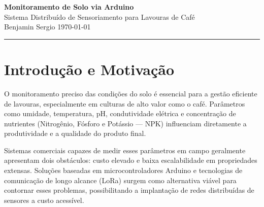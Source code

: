 \documentclass[12pt,a4paper]{article}
\begin{document}
\begin{center}
    {\LARGE\bfseries Monitoramento de Solo via Arduino}\\[0.4em]
    {\large Sistema Distribuído de Sensoriamento para Lavouras de Café}\\[0.8em]
    {\normalsize Benjamin Sergio \quad\textbar\quad \today}
\end{center}

\vspace{0.5em}
\hrule
\vspace{1em}

\begin{abstract}
\noindent
Este documento apresenta o projeto \textit{Monitoramento-Via-Arduino}, um sistema IoT
distribuído para monitoramento de parâmetros de solo em lavouras de café. O sistema
é composto por uma rede de nós sensores de baixo custo e baixo consumo energético
que coletam dados de umidade, temperatura, pH e nutrientes NPK, transmitindo-os
via LoRa a um nó mestre central. O nó mestre agrega os dados, aplica modelos de
inteligência artificial para predição indireta de NPK e os encaminha para plataformas
em nuvem. O protótipo inicial tem orçamento estimado em R\$~250,00.
\end{abstract}

\vspace{0.5em}

\section{Introdução e Motivação}

O monitoramento preciso das condições do solo é essencial para a gestão eficiente de
lavouras, especialmente em culturas de alto valor como o café. Parâmetros como
umidade, temperatura, pH, condutividade elétrica e concentração de nutrientes
(Nitrogênio, Fósforo e Potássio --- NPK) influenciam diretamente a produtividade e
a qualidade do produto final.

Sistemas comerciais capazes de medir esses parâmetros em campo geralmente apresentam
dois obstáculos: custo elevado e baixa escalabilidade em propriedades extensas.
Soluções baseadas em microcontroladores Arduino e tecnologias de comunicação de longo
alcance (LoRa) surgem como alternativa viável para contornar esses problemas,
possibilitando a implantação de redes distribuídas de sensores a custo acessível.
\end{document}
